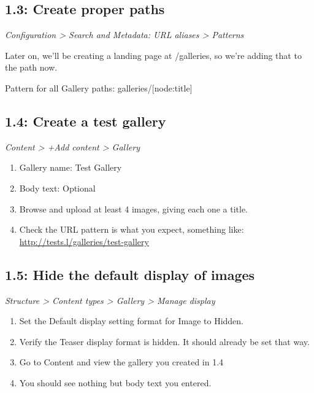 \documentclass[letterpaper,10pt,english]{sphinxmanual}
\begin{document}
\subsection{1.3: Create proper paths}
\label{slides:create-proper-paths}
\emph{Configuration \textgreater{} Search and Metadata: URL aliases \textgreater{} Patterns}

Later on, we’ll be creating a landing page at /galleries, so we’re adding that to the path now.

Pattern for all Gallery paths: galleries/{[}node:title{]}


\subsection{1.4: Create a test gallery}
\label{slides:create-a-test-gallery}
\emph{Content \textgreater{} +Add content \textgreater{} Gallery}
\begin{enumerate}
\item {} 
Gallery name: Test Gallery

\item {} 
Body text: Optional

\item {} 
Browse and upload at least 4 images, giving each one a title.

\item {} 
Check the URL pattern is what you expect, something like: \href{http://tests.l/galleries/test-gallery}{http://tests.l/galleries/test-gallery}

\end{enumerate}


\subsection{1.5: Hide the default display of images}
\label{slides:hide-the-default-display-of-images}
\emph{Structure \textgreater{} Content types \textgreater{} Gallery \textgreater{} Manage display}
\begin{enumerate}
\item {} 
Set the Default display setting format for Image to Hidden.

\item {} 
Verify the Teaser display format is hidden. It should already be set that way.

\item {} 
Go to Content and view the gallery you created in 1.4

\item {} 
You should see nothing but body text you entered.

\end{enumerate}
\end{document}
